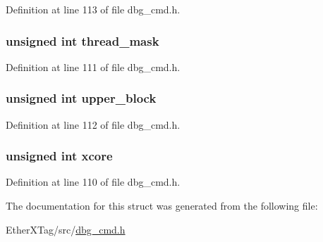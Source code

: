 Definition at line 113 of file dbg\-\_\-cmd.\-h.

\hypertarget{structdbg__cmd__type__read__regs_a2cafb0001a9bc70c6466b0d0ab295c0a}{
\subsubsection[{thread\-\_\-mask}]{\setlength{\rightskip}{0pt plus 5cm}unsigned int thread\-\_\-mask}}\label{structdbg__cmd__type__read__regs_a2cafb0001a9bc70c6466b0d0ab295c0a}


Definition at line 111 of file dbg\-\_\-cmd.\-h.

\hypertarget{structdbg__cmd__type__read__regs_a78e2cce5b7b32d6e7d7f5b1cb281f39f}{
\subsubsection[{upper\-\_\-block}]{\setlength{\rightskip}{0pt plus 5cm}unsigned int upper\-\_\-block}}\label{structdbg__cmd__type__read__regs_a78e2cce5b7b32d6e7d7f5b1cb281f39f}


Definition at line 112 of file dbg\-\_\-cmd.\-h.

\hypertarget{structdbg__cmd__type__read__regs_a78357326dd562d441c3c73f5676ac638}{
\subsubsection[{xcore}]{\setlength{\rightskip}{0pt plus 5cm}unsigned int xcore}}\label{structdbg__cmd__type__read__regs_a78357326dd562d441c3c73f5676ac638}


Definition at line 110 of file dbg\-\_\-cmd.\-h.



The documentation for this struct was generated from the following file\-:\begin{DoxyCompactItemize}
\item 
Ether\-X\-Tag/src/\hyperlink{dbg__cmd_8h}{dbg\-\_\-cmd.\-h}\end{DoxyCompactItemize}
